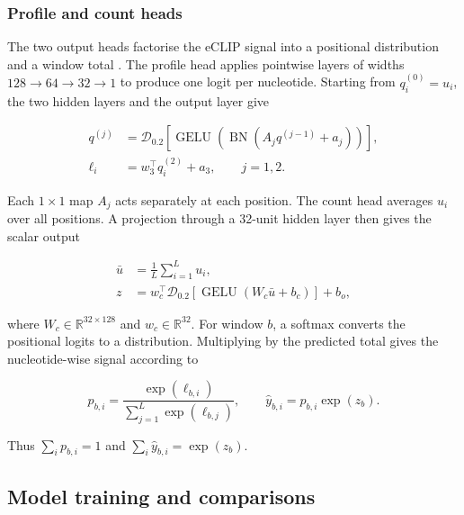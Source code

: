 \documentclass[webpdf,contemporary,large]{current_assets/oup-authoring-template}
\begin{document}
\subsubsection{Profile and count heads}

The two output heads factorise the eCLIP signal into a positional distribution and a window total \citep{avsec2021bpnet}. The profile head applies pointwise layers of widths $128\rightarrow64\rightarrow32\rightarrow1$ to produce one logit per nucleotide. Starting from $q_i^{(0)}=u_i$, the two hidden layers and the output layer give

\begin{equation}
\begin{aligned}
q^{(j)}&=\mathcal D_{0.2}\!\left[
\operatorname{GELU}\!\left(\operatorname{BN}(A_jq^{(j-1)}+a_j)\right)\right],\\
\ell_i&=w_3^\top q_i^{(2)}+a_3,\qquad j=1,2.
\end{aligned}
\label{eq:profile_head}
\end{equation}

Each $1\times1$ map $A_j$ acts separately at each position. The count head averages $u_i$ over all positions. A projection through a 32-unit hidden layer then gives the scalar output

\begin{equation}
\begin{aligned}
\bar u&=\frac1L\sum_{i=1}^{L}u_i,\\
z&=w_c^\top\mathcal D_{0.2}\!\left[
\operatorname{GELU}(W_c\bar u+b_c)\right]+b_o,
\end{aligned}
\label{eq:count_head}
\end{equation}

where $W_c\in\mathbb R^{32\times128}$ and $w_c\in\mathbb R^{32}$. For window $b$, a softmax converts the positional logits to a distribution. Multiplying by the predicted total gives the nucleotide-wise signal according to

\begin{equation}
p_{b,i}=\frac{\exp(\ell_{b,i})}{\sum_{j=1}^{L}\exp(\ell_{b,j})},
\qquad \hat y_{b,i}=p_{b,i}\exp(z_b).
\label{eq:dual_head_decode}
\end{equation}

Thus $\sum_i p_{b,i}=1$ and $\sum_i\hat y_{b,i}=\exp(z_b)$.

\subsection{Model training and comparisons}\label{sec:impl}
\end{document}
